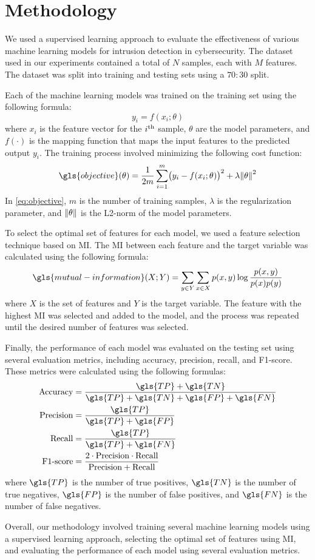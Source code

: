 \chapter{Methodology}  

We used a supervised learning approach to evaluate the effectiveness of various machine learning models for intrusion detection in cybersecurity. The dataset used in our experiments contained a total of \(N\) samples, each with \(M\) features. The dataset was split into training and testing sets using a \(70:30\) split.

Each of the machine learning models was trained on the training set using the following formula:
\begin{equation}
	y_i = f(x_i; \theta)
\end{equation}
where \(x_i\) is the feature vector for the \(i\textsuperscript{th}\) sample, \(\theta\) are the model parameters, and \(f(\cdot)\) is the mapping function that maps the input features to the predicted output \(y_i\). The training process involved minimizing the following cost function:
\begin{equation}
	\gls{objective}(\theta) = \frac{1}{2 m} \sum_{i = 1}^{m} \bigl( y_i - f(x_i; \theta) \bigr)^2 + \lambda \norm{\theta}^2
	\label{eq:objective}
\end{equation}
In \cref{eq:objective}, \(m\) is the number of training samples, \(\lambda\) is the regularization parameter, and \(\norm{\theta}\) is the L2-norm of the model parameters.

To select the optimal set of features for each model, we used a feature selection technique based on \ac{MI}. The \ac{MI} between each feature and the target variable was calculated using the following formula:
\begin{equation}
	\gls{mutual-information}(X; Y) = \sum_{y \in Y} \sum_{x \in X} p(x, y) \log \frac{p(x, y)}{p(x) p(y)}
\end{equation}
where \(X\) is the set of features and \(Y\) is the target variable. The feature with the highest \ac{MI} was selected and added to the model, and the process was repeated until the desired number of features was selected.

Finally, the performance of each model was evaluated on the testing set using several evaluation metrics, including accuracy, precision, recall, and F1-score. These metrics were calculated using the following formulas:
\begin{align}
	\text{Accuracy}  &= \frac{\gls{TP} + \gls{TN}}{\gls{TP} + \gls{TN} + \gls{FP} + \gls{FN}} \\
	\text{Precision} &= \frac{\gls{TP}}{\gls{TP} + \gls{FP}} \\
	\text{Recall}    &= \frac{\gls{TP}}{\gls{TP} + \gls{FN}} \\
	\text{F1-score}  &= \frac{2 \cdot \text{Precision} \cdot \text{Recall}}{\text{Precision} + \text{Recall}}
\end{align}
where \(\gls{TP}\) is the number of true positives, \(\gls{TN}\) is the number of true negatives, \(\gls{FP}\) is the number of false positives, and \(\gls{FN}\) is the number of false negatives.

Overall, our methodology involved training several machine learning models using a supervised learning approach, selecting the optimal set of features using \ac{MI}, and evaluating the performance of each model using several evaluation metrics.
